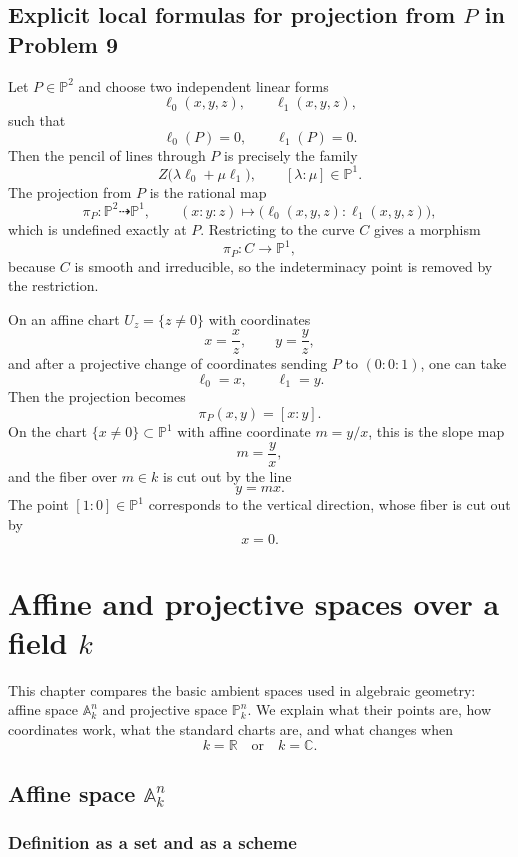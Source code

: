 \documentclass[12pt,a4paper]{article}
\theoremstyle{plain}
\theoremstyle{definition}      %
\begin{document}
\subsection*{Explicit local formulas for projection from \(P\) in Problem 9}

Let \(P\in \mathbb P^2\) and choose two independent linear forms
\[
\ell_0(x,y,z),
\qquad
\ell_1(x,y,z),
\]
such that
\[
\ell_0(P)=0,
\qquad
\ell_1(P)=0.
\]
Then the pencil of lines through \(P\) is precisely the family
\[
Z\bigl(\lambda \ell_0+\mu \ell_1\bigr),
\qquad
[\lambda:\mu]\in \mathbb P^1.
\]
The projection from \(P\) is the rational map
\[
\pi_P:\mathbb P^2\dashrightarrow \mathbb P^1,
\qquad
(x:y:z)\longmapsto \bigl(\ell_0(x,y,z):\ell_1(x,y,z)\bigr),
\]
which is undefined exactly at \(P\).
Restricting to the curve \(C\) gives a morphism
\[
\pi_P:C\to\mathbb P^1,
\]
because \(C\) is smooth and irreducible, so the indeterminacy point is removed by the restriction.

On an affine chart \(U_z=\{z\neq 0\}\) with coordinates
\[
x=\frac{x}{z},
\qquad
y=\frac{y}{z},
\]
and after a projective change of coordinates sending \(P\) to \((0:0:1)\), one can take
\[
\ell_0=x,
\qquad
\ell_1=y.
\]
Then the projection becomes
\[
\pi_P(x,y)=[x:y].
\]
On the chart \(\{x\neq 0\}\subset \mathbb P^1\) with affine coordinate \(m=y/x\), this is the slope map
\[
m=\frac{y}{x},
\]
and the fiber over \(m\in k\) is cut out by the line
\[
y=mx.
\]
The point \([1:0]\in\mathbb P^1\) corresponds to the vertical direction, whose fiber is cut out by
\[
x=0.
\]

\section*{Affine and projective spaces over a field \(k\)}

This chapter compares the basic ambient spaces used in algebraic geometry:
affine space
\(\mathbb A^n_k\)
and projective space
\(\mathbb P^n_k\).
We explain what their points are, how coordinates work, what the standard charts are, and what changes when
\[
k=\mathbb R
\quad\text{or}\quad
k=\mathbb C.
\]

\subsection*{Affine space \(\mathbb A^n_k\)}

\subsubsection*{Definition as a set and as a scheme}
\end{document}
